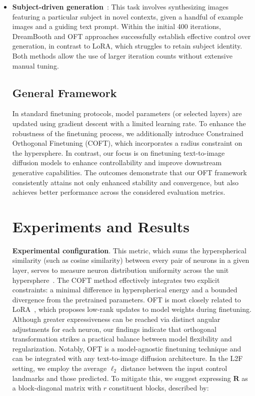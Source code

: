 \begin{itemize}[leftmargin=*,nosep]

    \item \textbf{Subject-driven generation}~\cite{ruiz2023dreambooth}: This task involves synthesizing images featuring a particular subject in novel contexts, given a handful of example images and a guiding text prompt. Within the initial 400 iterations, DreamBooth and OFT approaches successfully establish effective control over generation, in contrast to LoRA, which struggles to retain subject identity. Both methods allow the use of larger iteration counts without extensive manual tuning. \subsection{General Framework}

In standard finetuning protocols, model parameters (or selected layers) are updated using gradient descent with a limited learning rate. To enhance the robustness of the finetuning process, we additionally introduce Constrained Orthogonal Finetuning (COFT), which incorporates a radius constraint on the hypersphere. In contrast, our focus is on finetuning text-to-image diffusion models to enhance controllability and improve downstream generative capabilities. The outcomes demonstrate that our OFT framework consistently attains not only enhanced stability and convergence, but also achieves better performance across the considered evaluation metrics. \section{Experiments and Results}

\textbf{Experimental configuration}. This metric, which sums the hyperspherical similarity (such as cosine similarity) between every pair of neurons in a given layer, serves to measure neuron distribution uniformity across the unit hypersphere~\cite{liu2021learning}. The COFT method effectively integrates two explicit constraints: a minimal difference in hyperspherical energy and a bounded divergence from the pretrained parameters. OFT is most closely related to LoRA~\cite{hulora2022}, which proposes low-rank updates to model weights during finetuning. Although greater expressiveness can be reached via distinct angular adjustments for each neuron, our findings indicate that orthogonal transformation strikes a practical balance between model flexibility and regularization. Notably, OFT is a model-agnostic finetuning technique and can be integrated with any text-to-image diffusion architecture. In the L2F setting, we employ the average $\ell_2$ distance between the input control landmarks and those predicted. To mitigate this, we suggest expressing $\bm{R}$ as a block-diagonal matrix with $r$ constituent blocks, described by:


\end{itemize}
